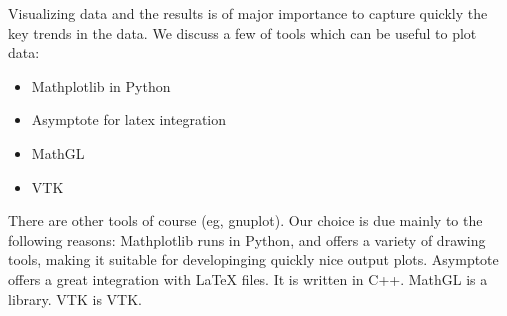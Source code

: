 


Visualizing data and the results is of major importance to capture quickly the
key trends in the data.
We discuss a few of tools which can be useful to plot data:
\begin{itemize}
   \item Mathplotlib in Python
   \item Asymptote for latex integration
   \item MathGL
   \item VTK
\end{itemize}

There are other tools of course (eg, gnuplot).
Our choice is due mainly to the following reasons: Mathplotlib runs in Python,
and offers a variety of drawing tools, making it suitable for developinging
quickly nice output plots. 
Asymptote offers a great integration with LaTeX files. It is written in C++.
MathGL is a \cpp{} library.
VTK is VTK.



